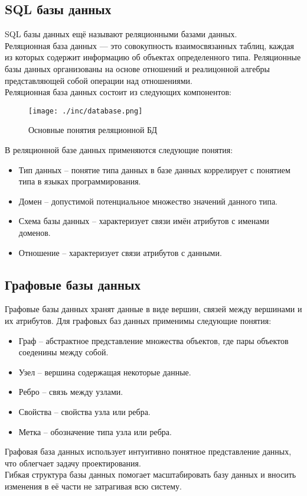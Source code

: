 \subsection{SQL базы данных}
SQL базы данных ещё называют реляционными базами данных.\\
Реляционная база данных — это совокупность взаимосвязанных таблиц, каждая из которых содержит информацию об объектах определенного типа. 
Реляционные базы данных организованы на основе отношений  и реалицонной алгебры представляющей собой операции над отношениями.\cite{BD}\\
Реляционная база данных состоит из следующих компонентов:
\begin{center}
\begin{figure}
  \centering
  \texttt{[image: ./inc/database.png]}
  \caption{Основные понятия реляционной БД}
  \label{fig:fig01}
\end{figure}
\end{center}
\cite{RBD}
В реляционной базе данных применяются следующие понятия: 
\begin{itemize}
\item Тип данных -- понятие типа данных в базе данных коррелирует с понятием типа в языках программирования.
\item Домен -- допустимой потенциальное множество значений данного типа.
\item Схема базы данных -- характеризует связи имён атрибутов с именами доменов.
\item Отношение -- характеризует связи атрибутов с данными.
\end{itemize}

\subsection{Графовые базы данных}
Графовые базы данных хранят данные в виде вершин, связей между вершинами и их атрибутов.
Для графовых баз данных применимы следующие понятия:
\begin{itemize}
\item Граф -- абстрактное представление множества объектов, где пары объектов соеденины между собой.
\item Узел -- вершина содержащая некоторые данные.
\item Ребро -- связь между узлами.
\item Свойства -- свойства узла или ребра.
\item Метка -- обозначение типа узла или ребра.
\end{itemize}
Графовая база данных использует интуитивно понятное представление данных, что облегчает задачу проектирования.\\
Гибкая структура базы данных помогает масштабировать базу данных и вносить изменения в её части не затрагивая всю систему.
